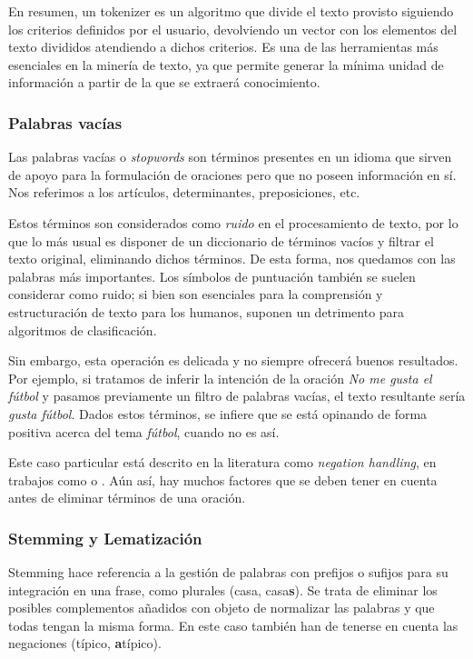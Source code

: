 En resumen, un tokenizer es un algoritmo que divide el texto provisto siguiendo los criterios definidos por el usuario, devolviendo un vector con los elementos del texto divididos atendiendo a dichos criterios. Es una de las herramientas más esenciales en la minería de texto, ya que permite generar la mínima unidad de información a partir de la que se extraerá conocimiento.

\subsubsection{Palabras vacías}
\label{sec:stopwords}
Las palabras vacías o \textit{stopwords} son términos presentes en un idioma que sirven de apoyo para la formulación de oraciones pero que no poseen información en sí. Nos referimos a los artículos, determinantes, preposiciones, etc.

Estos términos son considerados como \textit{ruido} en el procesamiento de texto, por lo que lo más usual es disponer de un diccionario de términos vacíos y filtrar el texto original, eliminando dichos términos. De esta forma, nos quedamos con las palabras más importantes. Los símbolos de puntuación también se suelen considerar como ruido; si bien son esenciales para la comprensión y estructuración de texto para los humanos, suponen un detrimento para algoritmos de clasificación.

Sin embargo, esta operación es delicada y no siempre ofrecerá buenos resultados. Por ejemplo, si tratamos de inferir la intención de la oración \textit{No me gusta el fútbol} y pasamos previamente un filtro de palabras vacías, el texto resultante sería \textit{gusta fútbol}. Dados estos términos, se infiere que se está opinando de forma positiva acerca del tema \textit{fútbol}, cuando no es así.

Este caso particular está descrito en la literatura como \textit{negation handling}, en trabajos como \cite{Farooq2017NegationHI} o \cite{Ali2020ConventionalAS}. Aún así, hay muchos factores que se deben tener en cuenta antes de eliminar términos de una oración.



\subsubsection{Stemming y Lematización}
Stemming hace referencia a la gestión de palabras con prefijos o sufijos para su integración en una frase, como plurales (casa, casa\textbf{s}). Se trata de eliminar los posibles complementos añadidos con objeto de normalizar las palabras y que todas tengan la misma forma. En este caso también han de tenerse en cuenta las negaciones (típico, \textbf{a}típico).

